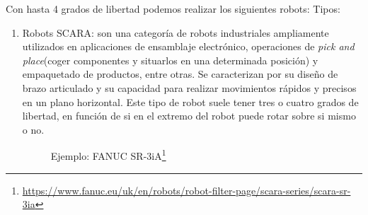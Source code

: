 Con hasta 4 grados de libertad podemos realizar los siguientes robots:
Tipos:

\begin{enumerate}
\item Robots \acs{SCARA}: son una categoría de robots industriales ampliamente utilizados en aplicaciones de ensamblaje electrónico, operaciones de 
\textit{pick and place}(coger componentes y situarlos en una determinada posición) y empaquetado de productos, entre otras.
Se caracterizan por su diseño de brazo articulado y su capacidad para realizar movimientos rápidos 
y precisos en un plano horizontal. Este tipo de robot suele tener tres o cuatro grados de libertad, en función de si en el extremo del 
robot puede rotar sobre si mismo o no. 

\begin{figure} [h!]
  \centering    
  \hspace{3cm}
  \caption[Fanuc SR-3iA]{Ejemplo: FANUC SR-3iA\footnote{\url{https://www.fanuc.eu/uk/en/robots/robot-filter-page/scara-series/scara-sr-3ia}}}
\end{figure}


\end{enumerate}

